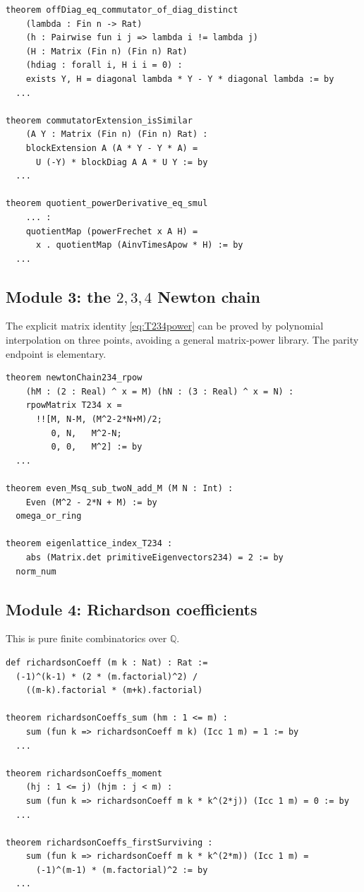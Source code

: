 \documentclass[11pt,oneside]{article}
\theoremstyle{definition}
\theoremstyle{remark}
\newcommand{\Q}{\mathbb Q}
\begin{document}
\begin{lstlisting}[style=leanstyle,caption={Schematic Lean targets for splitting and the quotient.}]
theorem offDiag_eq_commutator_of_diag_distinct
    (lambda : Fin n -> Rat)
    (h : Pairwise fun i j => lambda i != lambda j)
    (H : Matrix (Fin n) (Fin n) Rat)
    (hdiag : forall i, H i i = 0) :
    exists Y, H = diagonal lambda * Y - Y * diagonal lambda := by
  ...

theorem commutatorExtension_isSimilar
    (A Y : Matrix (Fin n) (Fin n) Rat) :
    blockExtension A (A * Y - Y * A) =
      U (-Y) * blockDiag A A * U Y := by
  ...

theorem quotient_powerDerivative_eq_smul
    ... :
    quotientMap (powerFrechet x A H) =
      x . quotientMap (AinvTimesApow * H) := by
  ...
\end{lstlisting}

\subsection{Module 3: the \texorpdfstring{$2,3,4$}{2, 3, 4} Newton chain}

The explicit matrix identity \eqref{eq:T234power} can be proved by polynomial interpolation on
three points, avoiding a general matrix-power library.  The parity endpoint is elementary.

\begin{lstlisting}[style=leanstyle,caption={Schematic Lean targets for the integral Newton chain.}]
theorem newtonChain234_rpow
    (hM : (2 : Real) ^ x = M) (hN : (3 : Real) ^ x = N) :
    rpowMatrix T234 x =
      !![M, N-M, (M^2-2*N+M)/2;
         0, N,   M^2-N;
         0, 0,   M^2] := by
  ...

theorem even_Msq_sub_twoN_add_M (M N : Int) :
    Even (M^2 - 2*N + M) := by
  omega_or_ring

theorem eigenlattice_index_T234 :
    abs (Matrix.det primitiveEigenvectors234) = 2 := by
  norm_num
\end{lstlisting}

\subsection{Module 4: Richardson coefficients}

This is pure finite combinatorics over $\Q$.

\begin{lstlisting}[style=leanstyle,caption={Schematic Lean targets for Richardson cancellation.}]
def richardsonCoeff (m k : Nat) : Rat :=
  (-1)^(k-1) * (2 * (m.factorial)^2) /
    ((m-k).factorial * (m+k).factorial)

theorem richardsonCoeffs_sum (hm : 1 <= m) :
    sum (fun k => richardsonCoeff m k) (Icc 1 m) = 1 := by
  ...

theorem richardsonCoeffs_moment
    (hj : 1 <= j) (hjm : j < m) :
    sum (fun k => richardsonCoeff m k * k^(2*j)) (Icc 1 m) = 0 := by
  ...

theorem richardsonCoeffs_firstSurviving :
    sum (fun k => richardsonCoeff m k * k^(2*m)) (Icc 1 m) =
      (-1)^(m-1) * (m.factorial)^2 := by
  ...
\end{lstlisting}
\end{document}
